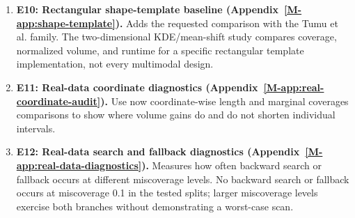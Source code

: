 \documentclass[10pt]{article}
\newcommand{\msapp}[1]{Appendix~\ref*{M-#1}}
\begin{document}
\begin{itemize}
\begin{enumerate}
\item \textbf{E10: Rectangular shape-template baseline (\msapp{app:shape-template}).}
Adds the requested comparison with the Tumu et al. family. The two-dimensional KDE/mean-shift study compares coverage, normalized volume, and runtime for a specific rectangular template implementation, not every multimodal design.

\item \textbf{E11: Real-data coordinate diagnostics (\msapp{app:real-coordinate-audit}).}
Use now coordinate-wise length and marginal coverages comparisons to show where volume gains do and do not shorten individual intervals.

\item \textbf{E12: Real-data search and fallback diagnostics (\msapp{app:real-data-diagnostics}).}
Measures how often backward search or fallback occurs at different miscoverage levels. No backward search or fallback occurs at miscoverage 0.1 in the tested splits; larger miscoverage levels exercise both branches without demonstrating a worst-case scan.
\end{enumerate}

\end{itemize}
\end{document}
